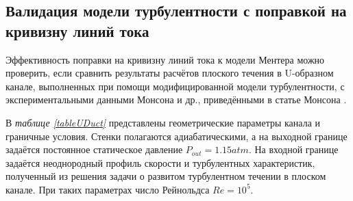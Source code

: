 \subsection{Валидация модели турбулентности с поправкой на кривизну линий тока}
\label{UDUCTComparison}

Эффективность поправки на кривизну линий тока к модели Ментера можно проверить, если сравнить результаты расчётов плоского течения в U-образном канале, выполненных при помощи модифицированной модели турбулентности, с экспериментальными данными Монсона и др., приведёнными в статье Монсона \cite{Monson}.

В \textit{таблице \ref{tableUDuct}} представлены геометрические параметры канала и граничные условия. Стенки полагаются адиабатическими, а на выходной границе задаётся постоянное статическое давление $P_{out} = 1.15 atm$. На входной границе задаётся неоднородный профиль скорости и турбулентных характеристик, полученный из решения задачи о развитом турбулентном течении в плоском канале. При таких параметрах число Рейнольдса $Re = 10^5$.

